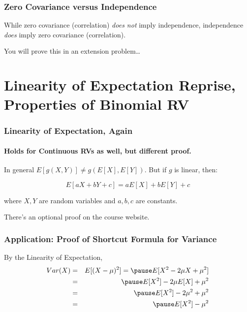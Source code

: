 \begin{frame}
  \frametitle{Zero Covariance versus Independence}
  While zero covariance (correlation) \emph{does not} imply independence, \alert{independence \emph{does} imply zero covariance (correlation)}.


  \vspace{2em}

  \hfill \alert{You will prove this in an extension problem\ldots}

\end{frame}
\section{Linearity of Expectation Reprise, Properties of Binomial RV}

\begin{frame}
\frametitle{Linearity of Expectation, Again}
\framesubtitle{Holds for Continuous RVs as well, but different proof.}
In general $E[g(X,Y)]\neq g(E[X],E[Y])$. 
But if $g$ is linear, then:

\Large
$$\boxed{E[aX + bY + c] = aE[X] + bE[Y] + c}$$

\normalsize
where $X,Y$ are random variables and $a,b,c$ are constants.

\vspace{2em}

\alert{There's an optional proof on the course website.}

\end{frame}

\begin{frame}
\frametitle{Application: Proof of Shortcut Formula for Variance}

By the Linearity of Expectation, 
\begin{eqnarray*}
	Var(X) &=&  E[(X - \mu)^2] = \pause E[X^2 - 2\mu X + \mu^2]\\
		&=& \pause E[X^2] - 2\mu E[X] + \mu^2\\
		&=& \pause E[X^2] - 2\mu^2 + \mu^2\\
		&=& \pause E[X^2] - \mu^2
\end{eqnarray*}


\end{frame}

